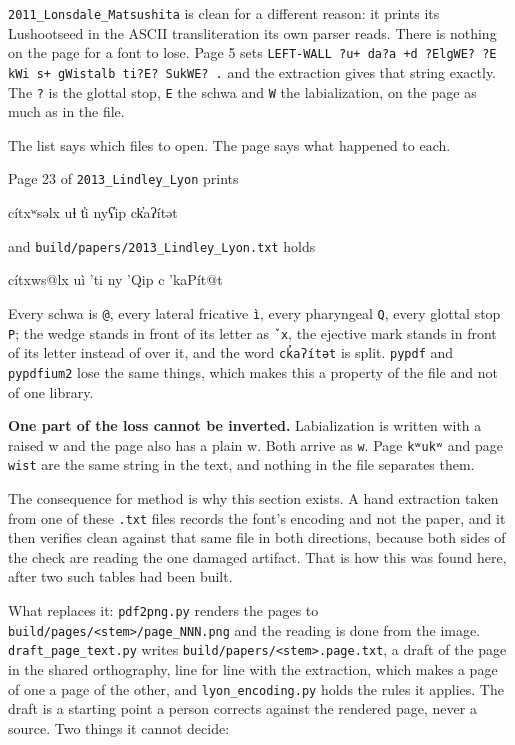 \texttt{2011\_\allowbreak{}Lonsdale\_\allowbreak{}Matsushita} is clean for a different reason: it prints its Lushootseed in the ASCII transliteration its own parser reads. There is nothing on the page for a font to lose. Page 5 sets \texttt{LEFT-\allowbreak{}WALL ?u+ da?a +d ?Elg\allowbreak{}WE? ?E k\allowbreak{}Wi s+ g\allowbreak{}Wistalb ti?E? Suk\allowbreak{}WE? .\allowbreak{}} and the extraction gives that string exactly. The \texttt{?} is the glottal stop, \texttt{E} the schwa and \texttt{W} the labialization, on the page as much as in the file.

The list says which files to open. The page says what happened to each.

Page 23 of \texttt{2013\_\allowbreak{}Lindley\_\allowbreak{}Lyon} prints

cítxʷsəlx uɬ t̓i nyʕ̓ip ck̓aʔítət

and \texttt{build/\allowbreak{}papers/\allowbreak{}2013\_\allowbreak{}Lindley\_\allowbreak{}Lyon.\allowbreak{}txt} holds

cítxws@lx uì ’ti ny ’Qip c ’kaPít@t

Every schwa is \texttt{@}, every lateral fricative \texttt{ì}, every pharyngeal \texttt{Q}, every glottal stop \texttt{P}; the wedge stands in front of its letter as \texttt{ˇx}, the ejective mark stands in front of its letter instead of over it, and the word \texttt{ck̓aʔítət} is split. \texttt{pypdf} and \texttt{pypdfium2} lose the same things, which makes this a property of the file and not of one library.

\textbf{One part of the loss cannot be inverted.} Labialization is written with a raised w and the page also has a plain w. Both arrive as \texttt{w}. Page \texttt{kʷukʷ} and page \texttt{wist} are the same string in the text, and nothing in the file separates them.

The consequence for method is why this section exists. A hand extraction taken from one of these \texttt{.\allowbreak{}txt} files records the font's encoding and not the paper, and it then verifies clean against that same file in both directions, because both sides of the check are reading the one damaged artifact. That is how this was found here, after two such tables had been built.

What replaces it: \texttt{pdf2png.\allowbreak{}py} renders the pages to \texttt{build/\allowbreak{}pages/\allowbreak{}<stem>/\allowbreak{}page\_\allowbreak{}NNN.\allowbreak{}png} and the reading is done from the image. \texttt{draft\_\allowbreak{}page\_\allowbreak{}text.\allowbreak{}py} writes \texttt{build/\allowbreak{}papers/\allowbreak{}<stem>.\allowbreak{}page.\allowbreak{}txt}, a draft of the page in the shared orthography, line for line with the extraction, which makes a page of one a page of the other, and \texttt{lyon\_\allowbreak{}encoding.\allowbreak{}py} holds the rules it applies. The draft is a starting point a person corrects against the rendered page, never a source. Two things it cannot decide:

